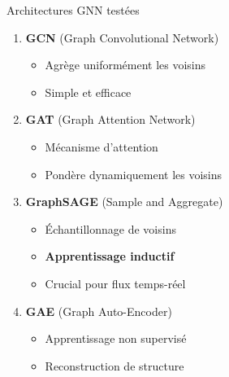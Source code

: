 ﻿\documentclass[aspectratio=169]{beamer}
\begin{document}
\begin{frame}{Architectures GNN testées}
\begin{enumerate}
    \item \textbf{GCN} (Graph Convolutional Network)
    \begin{itemize}
        \item Agrège uniformément les voisins
        \item Simple et efficace
    \end{itemize}
    
    \item \textbf{GAT} (Graph Attention Network)
    \begin{itemize}
        \item Mécanisme d'attention
        \item Pondère dynamiquement les voisins
    \end{itemize}
    
    \item \textbf{\textcolor{accentorange}{GraphSAGE}} (Sample and Aggregate)
    \begin{itemize}
        \item Échantillonnage de voisins
        \item \textcolor{accentorange}{\textbf{Apprentissage inductif}}
        \item Crucial pour flux temps-réel
    \end{itemize}
    
    \item \textbf{GAE} (Graph Auto-Encoder)
    \begin{itemize}
        \item Apprentissage non supervisé
        \item Reconstruction de structure
    \end{itemize}
\end{enumerate}
\end{frame}
\end{document}
